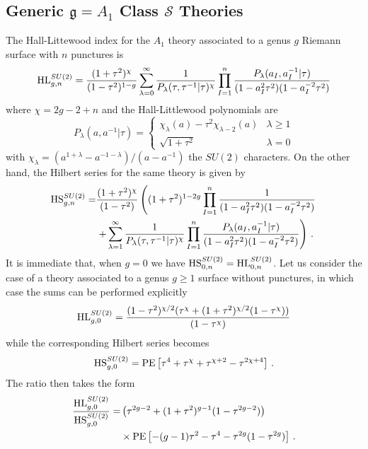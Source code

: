 \documentclass[main.tex]{subfiles}
\begin{document}
\subsection{Generic \texorpdfstring{$\mathfrak{g}=A_1$}{g=A1} Class \texorpdfstring{$\mathcal{S}$}{S} Theories}
The Hall-Littewood index for the $A_1$ theory associated to a genus $g$ Riemann surface with $n$ punctures is \cite{Gadde:2011uv}
\begin{equation}
\textrm{HL}^{SU(2)}_{g,n}=\frac{(1+\tau^2)^{\chi}}{(1-\tau^2)^{1-g}}\sum_{\lambda=0}^{\infty}\frac{1}{P_{\lambda}(\tau,\tau^{-1}|\tau)^{\chi}}\prod_{I=1}^n\frac{P_{\lambda}(a_I,a_I^{-1}|\tau)}{(1-a_I^2\tau^2)(1-a_I^{-2}\tau^2)}
\end{equation}
where $\chi=2g-2+n$ and the Hall-Littlewood polynomials are 
\begin{equation}
P_{\lambda}(a,a^{-1}|\tau)=\begin{cases}
\chi_{\lambda}(a)-\tau^2\chi_{\lambda-2}(a)&\lambda\geq1\\
\sqrt{1+\tau^2}&\lambda=0
\end{cases}
\end{equation}
with $\chi_{\lambda}=(a^{1+\lambda}-a^{-1-\lambda})/(a-a^{-1})$ the $SU(2)$ characters.
On the other hand, the Hilbert series for the same theory is given by \cite{Hanany:2010qu}
\begin{equation}
\begin{aligned}
\textrm{HS}^{SU(2)}_{g,n}=&\frac{(1+\tau^2)^{\chi}}{(1-\tau^2)}\left((1+\tau^2)^{1-2g}\prod_{I=1}^n\frac{1}{(1-a_I^2\tau^2)(1-a_I^{-2}\tau^2)}\right.\\
&\left.+\sum_{\lambda=1}^{\infty}\frac{1}{P_{\lambda}(\tau,\tau^{-1}|\tau)^{\chi}}\prod_{I=1}^n\frac{P_{\lambda}(a_I,a_I^{-1}|\tau)}{(1-a_I^2\tau^2)(1-a_I^{-2}\tau^2)}\right)\,.
\end{aligned}
\end{equation}
It is immediate that, when $g=0$ we have $\textrm{HS}^{SU(2)}_{0,n}=\textrm{HL}^{SU(2)}_{0,n}$.
Let us consider the case of a theory associated to a genus $g\geq1$ surface without punctures, in which case the sums can be performed explicitly
\begin{equation}
\textrm{HL}^{SU(2)}_{g,0}=\frac{(1-\tau^2)^{\chi/2}(\tau^{\chi}+(1+\tau^2)^{\chi/2}(1-\tau^{\chi}))}{(1-\tau^{\chi})}
\end{equation}
while the corresponding Hilbert series becomes
\begin{equation}
\textrm{HS}^{SU(2)}_{g,0}=\operatorname{\mathrm{PE}}\left[\tau^4+\tau^{\chi}+\tau^{\chi+2}-\tau^{2\chi+4}\right]\,.
\end{equation}
The ratio then takes the form
\begin{equation}
\begin{aligned}
\frac{\textrm{HL}^{SU(2)}_{g,0}}{\textrm{HS}^{SU(2)}_{g,0}}=& \left(\tau^{2g-2}+(1+\tau^2)^{g-1}(1-\tau^{2g-2})\right)\\&\times\operatorname{\mathrm{PE}}\left[-(g-1)\tau^2-\tau^4-\tau^{2g}(1-\tau^{2g})\right]\,.
\end{aligned}
\end{equation}
\end{document}
